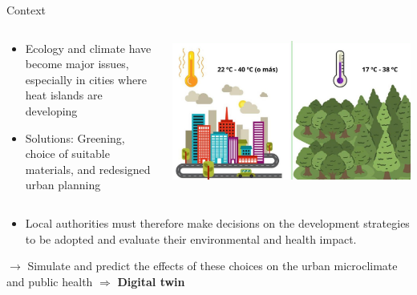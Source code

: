 \documentclass{beamer}
\begin{document}
\begin{frame}{Context}
    \small
    
    \begin{columns}[T]
    \begin{column}{0.6\textwidth}
    \begin{itemize}
        \setlength\itemindent{0.3cm}
        \item Ecology and climate have become major issues, especially in cities where heat islands are developing
        \item Solutions: Greening, choice of suitable materials, and redesigned urban planning
        \end{itemize}
    \end{column}

    \begin{column}{0.4\textwidth}
        \vspace{-0.3cm}
        \includegraphics[width=1\textwidth]{images/ilot_de_chaleur.jpg}
    \end{column}
    \end{columns}

    \vspace{0.2cm}

    \begin{itemize}
        \item Local authorities must therefore make decisions on the development strategies to be adopted and evaluate their environmental and health impact.
    \end{itemize}
    $\rightarrow$ Simulate and predict the effects of these choices on the urban microclimate and public health $\Rightarrow $ \textbf{Digital twin}
\end{frame}
\end{document}
